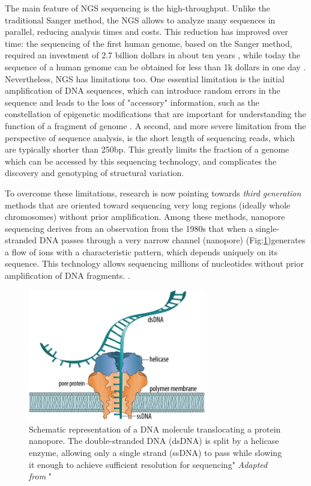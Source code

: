 The main feature of NGS sequencing is the high-throughput. Unlike the traditional Sanger method, the NGS allows to analyze many sequences in parallel, reducing analysis times and costs. This reduction has improved over time: the sequencing of the first human genome, based on the Sanger method, required an investment of 2.7 billion dollars in about ten years \cite{NIH:genomeprojectFAQ}, while today the sequence of a human genome can be obtained for less than 1k dollars in one day \cite{sequencing}. Nevertheless, NGS has limitations too. One essential limitation is the initial amplification of DNA sequences, which can introduce random errors in the sequence and leads to the loss of "accessory" information, such as the constellation of epigenetic modifications that are important for understanding the function of a fragment of genome \cite{sequencing}. A second, and more severe limitation from the perspective of sequence analysis, is the short length of sequencing reads, which are typically shorter than 250bp. This greatly limits the fraction of a genome which can be accessed by this sequencing technology, and complicates the discovery and genotyping of structural variation.

To overcome these limitations, research is now pointing towards \textit{third generation} methods that are oriented toward sequencing very long regions (ideally whole chromosomes) without  prior amplification. Among these methods, nanopore sequencing derives from an observation from the 1980s that when a single-stranded DNA passes through a very narrow channel (nanopore) (Fig:\ref{fig:nanopore.png})generates a flow of ions with a characteristic pattern, which depends uniquely on its sequence. This technology allows sequencing millions of nucleotides without prior amplification of DNA fragments. \cite{wiki:nanopore}.

\begin{figure}[H]
\centering
\includegraphics[width=0.70\textwidth]{fig/nanopore.png}
\decoRule
\caption{Schematic representation of a DNA molecule translocating a protein nanopore. The double-stranded DNA (dsDNA) is split by a helicase enzyme, allowing only a single strand (ssDNA) to pass while slowing it enough to achieve sufficient resolution for sequencing" \textit{Adapted from} \cite{sutton2019radiation}"} 
\label{fig:nanopore.png}
\end{figure}







